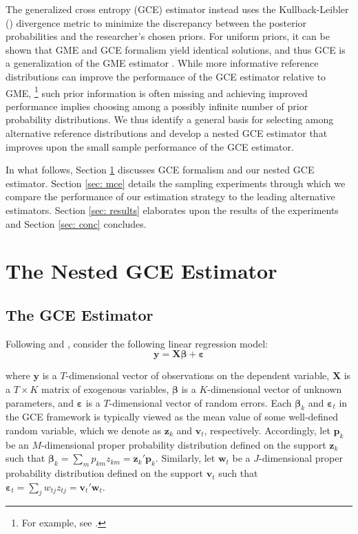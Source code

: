 \documentclass[english]{article}
\begin{document}
The generalized cross entropy (GCE) estimator instead uses the 
Kullback-Leibler (\citeyear{kullback1951}) divergence metric to minimize the 
discrepancy between the posterior probabilities and the researcher's chosen 
priors.
For uniform priors, it can be shown that GME and GCE formalism yield
identical solutions, and thus GCE is a generalization of the GME estimator
\citep{golan1996}.
While more informative reference distributions can improve the performance 
of the GCE estimator relative to GME,%
\footnote{For example, see \citet{heckelei2003}.}
such prior information is often missing and achieving improved performance 
implies choosing among a possibly infinite number of prior probability 
distributions.
We thus identify a general basis for selecting among alternative reference 
distributions and develop a nested GCE estimator that improves 
upon the small sample performance of the GCE estimator. 

In what follows, Section \ref{sec: gce} discusses GCE formalism and 
our nested GCE estimator.
Section \ref{sec: mce} details the sampling experiments through which we
compare the performance of our estimation strategy to the leading 
alternative estimators.
Section \ref{sec: results} elaborates upon the results of the 
experiments and Section \ref{sec: conc} concludes. 


\section{The Nested GCE Estimator}
\label{sec: gce}

\subsection{The GCE Estimator}

Following \cite{golan1996} and \citet{golan2008}, consider the following 
linear regression model: 
\begin{equation}
\mathbf{y} = \mathbf{X\beta} + \mathbf{\varepsilon}
\end{equation}

\noindent
where $\mathbf{y}$ is a $T$-dimensional vector of observations on the 
dependent variable, $\mathbf{X}$ is a $T\times K$ matrix of exogenous
variables, $\mathbf{\beta}$ is a $K$-dimensional vector of unknown 
parameters, and $\mathbf{\varepsilon}$ is a $T$-dimensional vector of 
random errors.
Each $\mathbf{\beta}_k$ and $\mathbf{\varepsilon}_t$ in the GCE 
framework is typically viewed as the mean value of some well-defined 
random variable, which we denote as $\mathbf{z}_k$ and $\mathbf{v}_t$, 
respectively.
Accordingly, let $\mathbf{p}_k$ be an $M$-dimensional proper 
probability distribution defined on the support $\mathbf{z}_k$ such that 
$\mathbf{\beta}_k = \sum_m p_{km}z_{km} = \mathbf{z}_k' 
\mathbf{p}_k$.
Similarly, let $\mathbf{w}_t$ be a $J$-dimensional proper probability 
distribution defined on the support $\mathbf{v}_t$ such that  
$\mathbf{\varepsilon}_t = \sum_j w_{tj}z_{tj} = \mathbf{v}_t' 
\mathbf{w}_t$.
\end{document}
